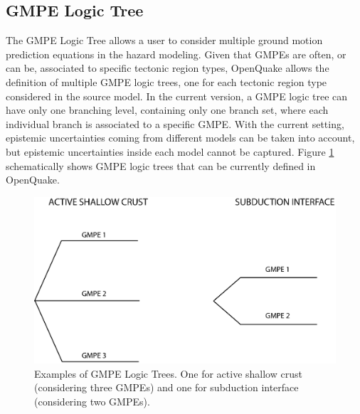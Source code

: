 \subsection{GMPE Logic Tree}
\label{hazard:gmpe_logic_tree}
The GMPE Logic Tree allows a user to consider multiple ground motion prediction equations in the hazard modeling. Given that GMPEs are often, or can be, associated to specific tectonic region types, OpenQuake allows the definition of multiple GMPE logic trees, one for each tectonic region type considered in the source model. In the current version, a GMPE logic tree can have only one branching level, containing only one branch set, where each individual branch is associated to a specific GMPE. With the current setting, epistemic uncertainties coming from different models can be taken into account, but epistemic uncertainties inside each model cannot be captured.
Figure \ref{fig:GMPELogicTree} schematically shows GMPE logic trees that can be currently defined in OpenQuake.
\begin{figure}
\includegraphics[width=15cm]{./Figures/Part_Hazard/GMPELogicTree.eps}
\caption{Examples of GMPE Logic Trees. One for active shallow crust (considering three GMPEs) and one for subduction interface (considering two GMPEs).}
\label{fig:GMPELogicTree}
\end{figure}



